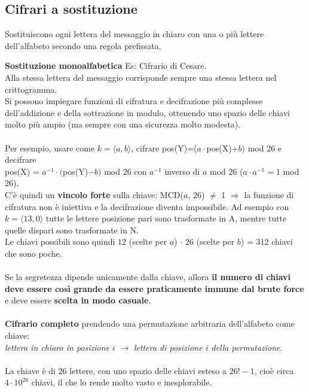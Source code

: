 \documentclass[10pt]{book}
\begin{document}
\subsection{Cifrari a sostituzione} Sostituiscono ogni lettera del messaggio in chiaro con una o più lettere dell'alfabeto secondo una regola prefissata.
\begin{list}{}{}
	\item \textbf{Sostituzione monoalfabetica} Es: Cifrario di Cesare.\\
	Alla stessa lettera del messaggio corrisponde sempre una stessa lettera nel crittogramma.\\
	Si possono impiegare funzioni di cifratura e decifrazione più complesse dell'addizione e della sottrazione in modulo, ottenendo uno spazio delle chiavi molto più ampio (ma sempre con una sicurezza molto modesta).\\\\
	Per esempio, usare come $k = \langle a,b \rangle$, cifrare pos(Y)=($a\cdot$pos(X)$+b)$ mod 26 e decifrare\\pos(X) = $a^{-1}\cdot($pos(Y)$-b)$ mod 26 con $a^{-1}$ inverso di $a$ mod 26 ($a\cdot a^{-1} = 1$ mod 26).\\
	C'è quindi un \textbf{vincolo forte} sulla chiave: MCD($a$, 26) $\neq$ 1 $\Rightarrow$ la funzione di cifratura non è iniettiva e la decifrazione diventa impossibile. Ad esempio con $k=\langle 13,0\rangle$ tutte le lettere posizione pari sono trasformate in A, mentre tutte quelle dispari sono trasformate in N.\\
	Le chiavi possibili sono quindi $12$ (scelte per $a$) $\cdot$ $26$ (scelte per $b$) = 312 chiavi che sono poche.\\\\
	Se la segretezza dipende unicamente dalla chiave, allora \textbf{il numero di chiavi deve essere così grande da essere praticamente immune dal brute force} e deve essere \textbf{scelta in modo casuale}.\\\\
	\textbf{Cifrario completo} prendendo una permutazione arbitraria dell'alfabeto come chiave:\\
\textit{lettera in chiaro in posizione $i$} $\longrightarrow$ \textit{lettera di posizione $i$ della permutazione}.\\\\
La chiave è di 26 lettere, con uno spazio delle chiavi esteso a $26! - 1$, cioè circa $4\cdot 10^{26}$ chiavi, il che lo rende molto vasto e inesplorabile.\\

\end{list}
\end{document}
